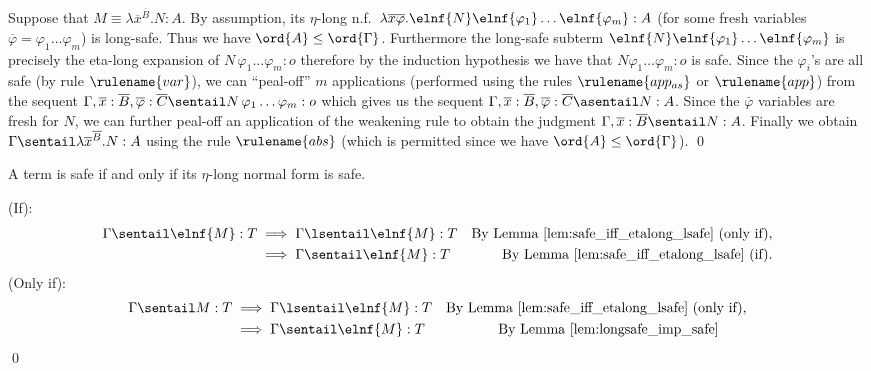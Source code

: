 Suppose that $M \equiv \lambda \overline{x}^{\overline B} . N : A$. By assumption,
its  $\eta$-long n.f.\ $\lambda \overline{x} \overline{\varphi} .
\elnf{N} \elnf{\varphi_1} \ldots \elnf{\varphi_m}: A$ (for some
fresh variables $\overline\varphi = \varphi_1 \ldots \varphi_m$) is long-safe. Thus
we have $\ord{A}\leq\ord{\Gamma}$. Furthermore the long-safe subterm
$\elnf{N} \elnf{\varphi_1} \ldots \elnf{\varphi_m}$ is precisely the
eta-long expansion of $N\, \varphi_1 \ldots \varphi_m : o$ therefore by
the induction hypothesis we have that $N \varphi_1 \ldots \varphi_m
:o$ is safe. Since the $\varphi_i$'s are all safe (by rule
$\rulename{var}$), we can ``peal-off'' $m$ applications (performed using
the rules $\rulename{app_{as}}$ or $\rulename{app}$) from the sequent $\Gamma,
\overline{x}:\overline B,
\overline{\varphi}:\overline C \sentail N\, \varphi_1 \ldots
\varphi_m :o$ which gives us the sequent $\Gamma, \overline{x}:\overline B,
\overline{\varphi}:\overline C \asentail N : A$. Since the $\overline{\varphi}$
variables are fresh for $N$, we can further peal-off an
application of the weakening rule to obtain the judgment $\Gamma,
\overline{x}:\overline B \sentail N : A$. Finally we obtain $\Gamma \sentail
\lambda \overline{x}^{\overline{B}} . N : A$ using the rule $\rulename{abs}$ (which
is permitted since we have $\ord{A}\leq\ord{\Gamma}$). \qed
\smallskip






\begin{proposition}
\label{prop:safe_iff_elnfsafe}
A term is safe if and only if its $\eta$-long normal form is safe.
\end{proposition}
\proof
(If):
\begin{align*}
  \Gamma \sentail \elnf{M}:T &\implies   \Gamma \lsentail \elnf{M}:T &  \mbox{By Lemma \ref{lem:safe_iff_etalong_lsafe} (only if),} \\
  &\implies   \Gamma \sentail \elnf{M}:T &  \mbox{By Lemma \ref{lem:safe_iff_etalong_lsafe} (if).}
\end{align*}
(Only if):
\begin{align*}
  \Gamma \sentail M:T &\implies   \Gamma \lsentail \elnf{M}:T &  \mbox{By Lemma \ref{lem:safe_iff_etalong_lsafe} (only if),} \\
  &\implies \Gamma \sentail \elnf{M}:T &  \mbox{By Lemma \ref{lem:longsafe_imp_safe}\qquad }
\end{align*}
\qed


